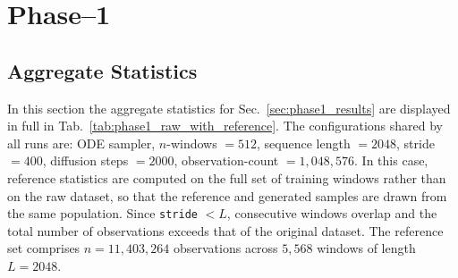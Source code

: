 \section{Phase--1}
\label{sec:app_phase1_results}
\subsection{Aggregate Statistics}
In this section the aggregate statistics for Sec.\ \ref{sec:phase1_results} are displayed in full in Tab.\ \ref{tab:phase1_raw_with_reference}. The configurations shared by all runs are: ODE sampler, $n$-windows $= 512$,
sequence length $= 2048$, stride $= 400$, diffusion steps $= 2000$,
observation-count $= 1,048,576$. In this case, reference statistics are computed on the full set of training 
windows rather than on the raw dataset, so that the reference and generated 
samples are drawn from the same population. Since \texttt{stride} $< L$, 
consecutive windows overlap and the total number of observations exceeds that 
of the original dataset. The reference set comprises $n = 11{,}403{,}264$
observations across $5{,}568$ windows of length $L = 2048$.

